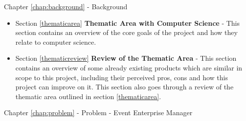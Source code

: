 





Chapter \ref{chap:background} - Background

\begin{itemize}
    \item Section \ref{thematicarea} \textbf{Thematic Area with Computer Science} - This section contains an overview of the core goals of the project and how they relate to computer science.


    \item Section \ref{thematicreview} \textbf{Review of the Thematic Area} - This section contains an overview of some already existing products which are similar in scope to this project, including their perceived pros, cons and how this project can improve on it. This section also goes through a review of the thematic area outlined in section \ref{thematicarea}.
\end{itemize}

Chapter \ref{chap:problem} - Problem - Event Enterprise Manager

